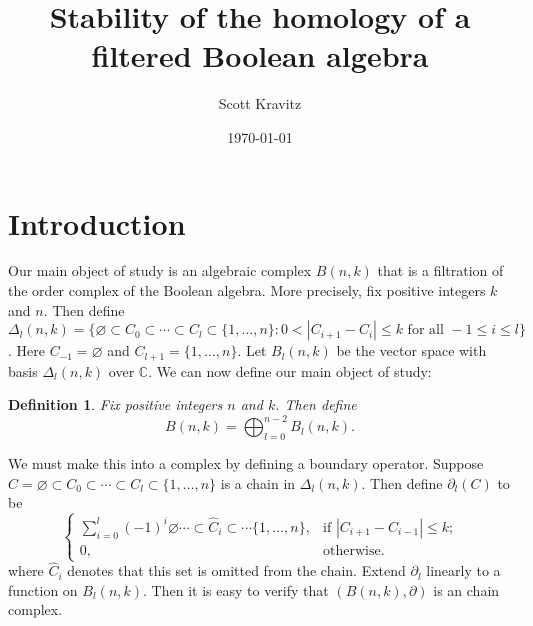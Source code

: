 \documentclass{amsart}
\newtheorem{definition}[theorem]{Definition}
\newcommand{\C}{\mathbb{C}}
\newcommand{\full}{\{1, \ldots, n\}}
\begin{document}
\title{Stability of the homology of a filtered Boolean algebra}
\address{Department of Mathematics, University of Michigan, Ann Arbor, MI 48109-1003} 
\author{Scott Kravitz}

\date{\today}     

\maketitle
\section{Introduction}\label{S:intro}

  Our main object of study is an algebraic complex $B(n, k)$ that is a filtration of the order complex of the 
Boolean algebra. More precisely, fix positive integers $k$ and $n$. Then define 
  $\Delta_l(n, k) = \{\varnothing \subset C_0 \subset \cdots \subset C_l \subset \{1, \ldots, n\}
  \colon 0 < |C_{i+1} - C_i| \le k 
  \mbox{ for all } -1 \le i \le l \}$. Here $C_{-1} = \varnothing$ and $C_{l+1} = \full$. Let $B_l(n, k)$ be the vector 
   space with basis $\Delta_l(n, k)$ over $\C$.
  We can now define our main object of study: 
\begin{definition}\label{:B(n,k)} Fix positive integers $n$ and $k$. Then define
  \begin{equation}
    B(n, k) = \bigoplus_{l=0}^{n-2} B_l(n, k).
  \end{equation}
\end{definition}
We must make this into a complex by defining a boundary operator. Suppose $C = \varnothing \subset C_0 \subset  \cdots
\subset C_l \subset \{1, \ldots, n\}$ is a chain in $\Delta_l(n, k)$.
Then define $\partial_l(C)$ to be 
\begin{equation}\label{E:delta}
  \begin{cases}
     \sum_{i=0}^l (-1)^i \varnothing \cdots \subset {\hat C_i} \subset \cdots \full, 
         &\text{if $|C_{i+1} - C_{i-1}| \le k$;}\\
     0, &\text{otherwise.}
  \end{cases}
\end{equation} where ${\hat C_i}$ denotes that this set is omitted from the chain. 
Extend $\partial_l$ linearly to a function on $B_l(n, k)$. Then it is easy to verify that $(B(n, k), \partial)$
is an chain complex.  
\end{document}
